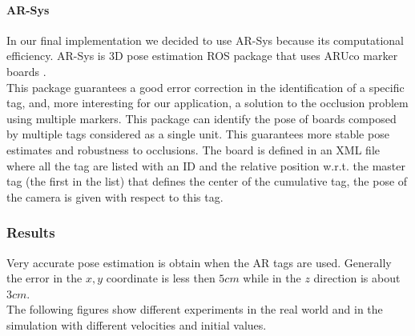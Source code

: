 \paragraph{AR-Sys}
In our final implementation we decided to use AR-Sys because its computational efficiency. AR-Sys is 3D pose estimation ROS package that uses ARUco marker boards \cite{Aruco2014}.\\
This package guarantees a good error correction in the identification of a specific tag, and, more interesting for our application, a solution to the occlusion problem using multiple markers. This package can identify the pose of boards composed by multiple tags considered as a single unit. This guarantees more stable pose estimates and robustness to occlusions. The board is defined in an XML file where all the tag are listed with an ID and the relative position w.r.t. the master tag (the first in the list) that defines the center of the cumulative tag, the pose of the camera is given with respect to this tag. 

\subsubsection{Results}
Very accurate pose estimation is obtain when the AR tags are used. Generally the error in the $x,y$ coordinate is less then $5cm$ while in the $z$ direction is about $3cm$.\\
The following figures show different experiments in the real world and in the simulation with different velocities and initial values.\\

